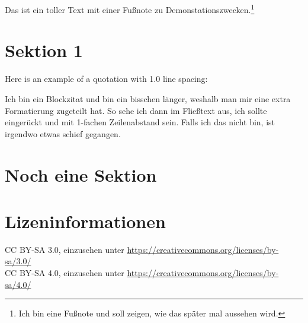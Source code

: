 \documentclass[12pt,a4paper]{article} %
\newenvironment{blockzitat}
{\singlespacing\quote}
{\endquote}
\begin{document}
	Das ist ein toller Text mit einer Fußnote zu Demonstationszwecken.\footnote{Ich bin eine Fußnote und soll zeigen, wie das später mal aussehen wird.}
	
	\section{Sektion 1}
	
	Here is an example of a quotation with 1.0 line spacing:
	
	\begin{blockzitat}
		Ich bin ein Blockzitat und bin ein bisschen länger, weshalb man mir eine extra Formatierung zugeteilt hat. So sehe ich dann im Fließtext aus, ich sollte eingerückt und mit 1-fachen Zeilenabstand sein. Falls ich das nicht bin, ist irgendwo etwas schief gegangen.
	\end{blockzitat}
	
	\section{Noch eine Sektion}
	
	
	\newpage
	\printbibliography[heading=bibintoc,keyword={source},title={Quellenverzeichnis}] %
	\printbibliography[heading=bibintoc,notkeyword={source},title={Literaturverzeichnis}] %
	\listoffigures %
	
	
	\section*{Lizeninformationen}
	CC BY-SA 3.0, einzusehen unter \url{https://creativecommons.org/licenses/by-sa/3.0/} \\
	CC BY-SA 4.0, einzusehen unter \url{https://creativecommons.org/licenses/by-sa/4.0/}
	
	
\end{document}
